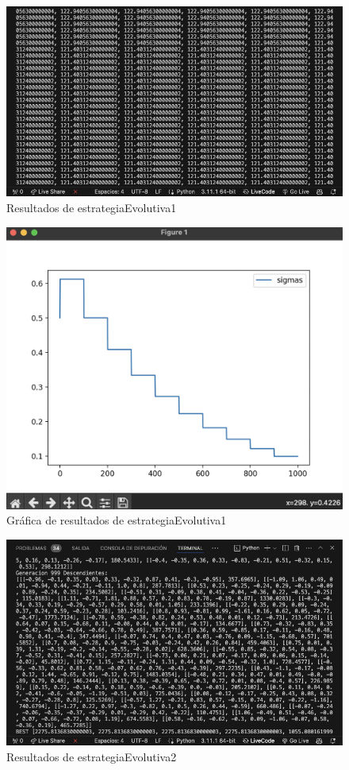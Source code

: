 \documentclass{report}
\begin{document}
\begin{figure}[H]
    \centering
    \includegraphics[width=1\textwidth]{evolutiva1.2.png}
    \caption{Resultados de estrategiaEvolutiva1}
\end{figure}

\begin{figure}[H]
    \centering
    \includegraphics[width=1\textwidth]{graficaev1.2.png}
    \caption{Gráfica de resultados de estrategiaEvolutiva1}
\end{figure}

\begin{figure}[H]
    \centering
    \includegraphics[width=1\textwidth]{evolutiva2.png}
    \caption{Resultados de estrategiaEvolutiva2}
\end{figure}
\end{document}
